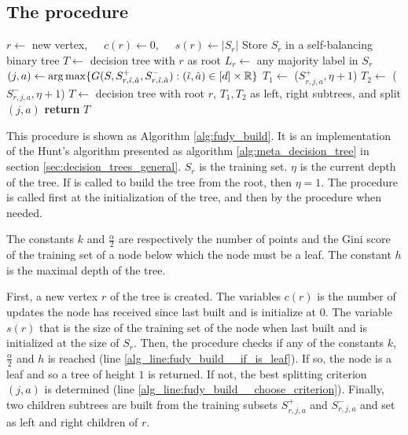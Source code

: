 \subsection{The \AlgoBuild{} procedure}


\begin{algorithm}
\caption{\algo{}.\AlgoBuild{}} \label{alg:fudy_build}
\begin{algorithmic}[1]
\State $r \gets$ new vertex,~~~$c(r) \gets 0$,~~~$s(r) \gets |S_r|$ %
 \label{alg_line:fudy_build__if_is_leaf}
\State Store $S_r$ in a self-balancing binary tree\label{alg_line:fudy_build__store_data}
\State $T \gets$ decision tree with $r$ as root
\State $L_r \gets $ any majority label in $S_r$
\Else
\State $(j,a) \gets \arg \max \{G(S,S^+_{r,\hat \iota, \hat a}, S^-_{r,\hat \iota, \hat a}) : (\hat \iota, \hat a) \in [d] \times \mathbb{R}\}$\label{alg_line:fudy_build__choose_criterion}
\State $T_1 \gets $ \AlgoBuild{}($S^+_{r,j,a}, \eta + 1$)\label{alg_line:fudy_build__left_child}
\State $T_2 \gets $ \AlgoBuild{}($S^-_{r,j,a}, \eta + 1$)\label{alg_line:fudy_build__right_child}
\State $T \gets$ decision tree with root $r$, $T_1,T_2$ as left, right subtrees, and split $(j,a)$
\EndIf
\State \textbf{return} $T$
\EndProcedure
\end{algorithmic}
\end{algorithm}

This procedure is shown as Algorithm \ref{alg:fudy_build}. It is an implementation of the Hunt's algorithm presented as algorithm \ref{alg:meta_decision_tree} in section \ref{sec:decision_trees_general}. $S_r$ is the training set. $\eta$ is the current depth of the tree. If \AlgoBuild{} is called to build the tree from the root, then $\eta=1$. The procedure is called first at the initialization of the tree, and then by the \AlgoUpdate{} procedure when needed.

The constants $k$ and $\frac{\alpha}{2}$ are respectively the number of points and the Gini score of the training set of a node below which the node must be a leaf. The constant $h$ is the maximal depth of the tree.

First, a new vertex $r$ of the tree is created. The variables $c(r)$ is the number of updates the node has received since last built and is initialize at $0$. The variable $s(r)$ that is the size of the training set of the node when last built and is initialized at the size of $S_r$. Then, the procedure checks if any of the constants $k$, $\frac{\alpha}{2}$ and $h$ is reached (line \ref{alg_line:fudy_build__if_is_leaf}). If so, the node is a leaf and so a tree of height $1$ is returned. If not, the best splitting criterion $(j,a)$ is determined (line \ref{alg_line:fudy_build__choose_criterion}). Finally, two children subtrees are built from the training subsets $S^+_{r,j,a}$ and $S^-_{r,j,a}$ and set as left and right children of $r$.

